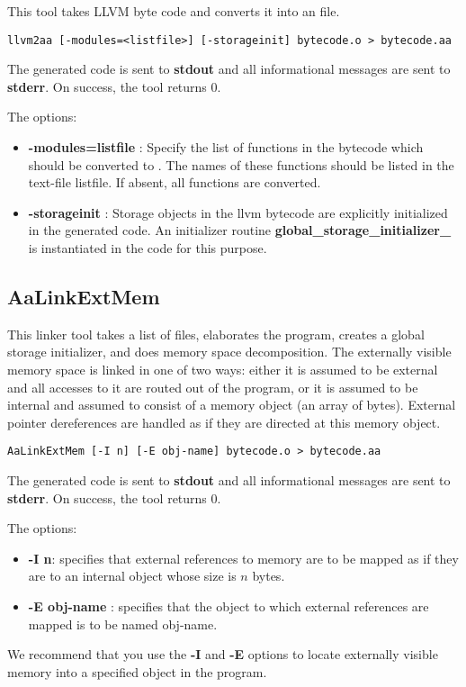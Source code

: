 This tool takes LLVM byte code and converts it into an
\Aa file.
\begin{verbatim}
llvm2aa [-modules=<listfile>] [-storageinit] bytecode.o > bytecode.aa
\end{verbatim}
The generated \Aa code is sent to {\bf stdout} and all informational
messages are sent to {\bf stderr}.  On success, the tool returns 0.

The options:
\begin{itemize}
\item {\bf -modules=listfile} : Specify the list of functions in the bytecode
which should be converted to \Aa.   The names of these functions should be
listed in the text-file listfile. If absent, all functions
are converted.
\item {\bf -storageinit} :  Storage objects in the llvm bytecode
are explicitly initialized in the generated \Aa code.   An initializer
routine {\bf global\_storage\_initializer\_} is instantiated in
the \Aa code for this purpose.
\end{itemize}

\subsection{{\bf AaLinkExtMem}}

This linker tool takes a list of \Aa files, elaborates the program,
creates a global storage initializer, and
does memory space decomposition.  The externally visible memory space is
linked in one of two ways: either it is assumed to be external
and all accesses to it are routed out of the \Aa program,
or it is assumed to be internal and assumed to consist of
a memory object (an array of bytes).  External pointer dereferences
are handled as if they are directed at this memory object.
\begin{verbatim}
AaLinkExtMem [-I n] [-E obj-name] bytecode.o > bytecode.aa
\end{verbatim}
The generated \Aa code is sent to {\bf stdout} and all informational
messages are sent to {\bf stderr}.  On success, the tool returns 0.

The options:
\begin{itemize}
\item {\bf -I n}: specifies that external references to memory
are to be mapped as if they are to an internal object whose size
is $n$ bytes.
\item {\bf -E obj-name} : specifies that the object to which
external references are mapped is to be named obj-name.
\end{itemize}
We recommend that you use the {\bf -I} and {\bf -E} options to
locate externally visible memory into a specified object in the
\Aa program.   

